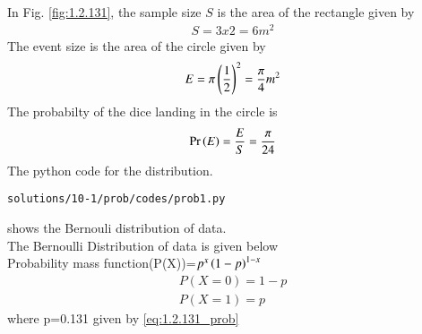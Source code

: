 In Fig. \ref{fig:1.2.131}, the sample size $S$ is the area of the rectangle given by 
\begin{align}
S=3x2=6 m^2
\end{align}
The event size is the area of the circle given by 
\begin{align}
E = \pi\left(\frac{1}{2}\right)^2=\frac{\pi}{4} m^2 
\end{align}
The probabilty of the dice landing in the circle is
\begin{align}
\Pr\left(E\right) = \frac{E}{S} = \frac{\pi}{24}
\label{eq:1.2.131_prob}
\end{align}
%
The python code for the distribution.
\begin{lstlisting}
solutions/10-1/prob/codes/prob1.py
\end{lstlisting}
shows the Bernouli distribution of data.
\\
The Bernoulli Distribution of data is given below
\\
Probability mass function(P(X))=$p^x\left(1-p\right)^{1-x}$
\begin{align}
P(X=0)=1-p
\\
P(X=1)=p
\end{align}
where p=0.131 given by \ref{eq:1.2.131_prob}
